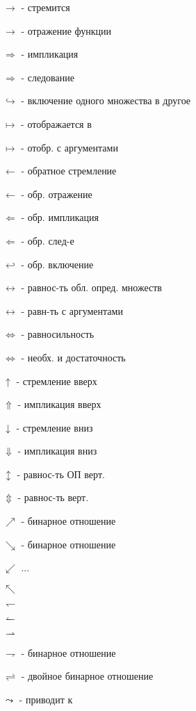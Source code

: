 \flushleft
\huge
\begin{multicols}{2}
$\to$ - стремится

$\longrightarrow$ - отражение функции

$\Rightarrow$ - импликация

$\Longrightarrow$ - следование

$\hookrightarrow$ - включение одного множества в другое

$\mapsto$ - отображается в

$\longmapsto$ - отобр. с аргументами

$\gets$ - обратное стремление

$\longleftarrow$ - обр. отражение

$\Leftarrow$ - обр. импликация

$\Longleftarrow$ - обр. след-е

$\hookleftarrow$ - обр. включение

$\leftrightarrow$ - равнос-ть обл. опред. множеств

$\longleftrightarrow$ - равн-ть с аргументами

$\Leftrightarrow$ - равносильность

$\Longleftrightarrow$ - необх. и достаточность

$\uparrow$ - стремление вверх

$\Uparrow$ - импликация вверх

$\downarrow$ - стремление вниз

$\Downarrow$ - импликация вниз

$\updownarrow$ - равнос-ть ОП верт.

$\Updownarrow$ - равнос-ть верт.

$\nearrow$ - бинарное отношение

$\searrow$ - бинарное отношение

$\swarrow$ ...

$\nwarrow$

$\leftharpoondown$

$\leftharpoonup$

$\rightharpoonup$

$\rightharpoondown $ - бинарное отношение

$\rightleftharpoons$ - двойное бинарное отношение

$\leadsto$ - приводит к
\end{multicols}